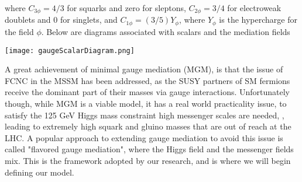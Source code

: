 where $C_{3\phi} = 4/3$ for squarks and zero for sleptons, $C_{2\phi} = 3/4$ for electroweak doublets and 0 for singlets, and $C_{1\phi} = (3/5) Y_\phi$, where $Y_\phi$ is the hypercharge for the field $\phi$. Below are diagrams associated with scalars and the mediation fields

\begin{center}
    \texttt{[image: gaugeScalarDiagram.png]}
\end{center}

A great achievement of minimal gauge mediation (MGM), is that the issue of FCNC in the MSSM has been addressed, as the SUSY partners of SM fermions receive the dominant part of their masses via gauge interactions. Unfortunately though, while MGM is a viable model, it has a real world practicality issue, to satisfy the 125 GeV Higgs mass constraint high messenger scales are needed, , leading to extremely high squark and gluino masses that are out of reach at the LHC. A popular approach to extending gauge mediation to avoid this issue is called "flavored gauge mediation", where the Higgs field and the messenger fields mix. This is the framework adopted by our research, and is where we will begin defining our model.








